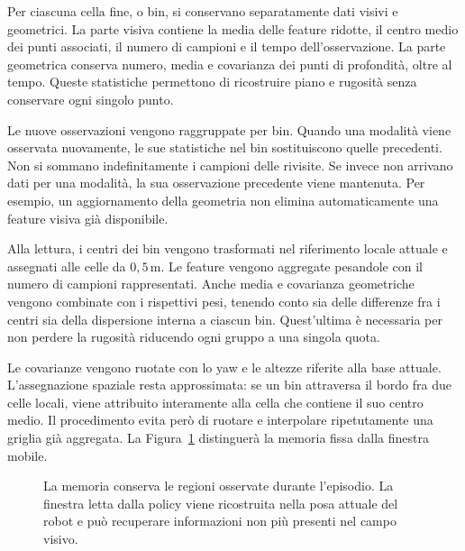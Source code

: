 Per ciascuna cella fine, o bin, si conservano separatamente dati visivi e geometrici. La parte visiva contiene la media delle feature ridotte, il centro medio dei punti associati, il numero di campioni e il tempo dell'osservazione. La parte geometrica conserva numero, media e covarianza dei punti di profondità, oltre al tempo. Queste statistiche permettono di ricostruire piano e rugosità senza conservare ogni singolo punto.

Le nuove osservazioni vengono raggruppate per bin. Quando una modalità viene osservata nuovamente, le sue statistiche nel bin sostituiscono quelle precedenti. Non si sommano indefinitamente i campioni delle rivisite. Se invece non arrivano dati per una modalità, la sua osservazione precedente viene mantenuta. Per esempio, un aggiornamento della geometria non elimina automaticamente una feature visiva già disponibile.

Alla lettura, i centri dei bin vengono trasformati nel riferimento locale attuale e assegnati alle celle da $0{,}5\,\mathrm{m}$. Le feature vengono aggregate pesandole con il numero di campioni rappresentati. Anche media e covarianza geometriche vengono combinate con i rispettivi pesi, tenendo conto sia delle differenze fra i centri sia della dispersione interna a ciascun bin. Quest'ultima è necessaria per non perdere la rugosità riducendo ogni gruppo a una singola quota.

Le covarianze vengono ruotate con lo yaw e le altezze riferite alla base attuale. L'assegnazione spaziale resta approssimata: se un bin attraversa il bordo fra due celle locali, viene attribuito interamente alla cella che contiene il suo centro medio. Il procedimento evita però di ruotare e interpolare ripetutamente una griglia già aggregata. La Figura~\ref{fig:metodo-memoria-finestra} distinguerà la memoria fissa dalla finestra mobile.

\begin{figure}[tbp]
    \centering
    \caption[Memoria persistente e lettura locale]{La memoria conserva le regioni osservate durante l'episodio. La finestra letta dalla policy viene ricostruita nella posa attuale del robot e può recuperare informazioni non più presenti nel campo visivo.}
    \label{fig:metodo-memoria-finestra}
\end{figure}

